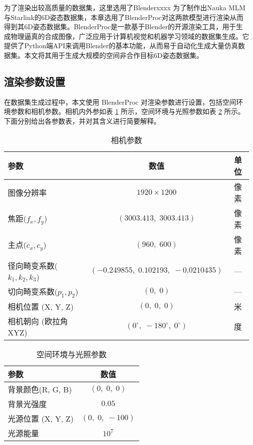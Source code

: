 为了渲染出较高质量的数据集，这里选用了Blenderxxxx
为了制作出Nauka MLM与Starlink的6D姿态数据集，本章选用了BlenderProc对这两款模型进行渲染从而得到其6D姿态数据集。BlenderProc是一款基于Blender的开源渲染工具，用于生成物理逼真的合成图像，广泛应用于计算机视觉和机器学习领域的数据集生成。它提供了Python端API来调用Blender的基本功能，从而易于自动化生成大量仿真数据集。本文将其用于生成大规模的空间非合作目标6D姿态数据集。

\subsection{渲染参数设置}
在数据集生成过程中，本文使用 BlenderProc 对渲染参数进行设置，包括空间环境参数和相机参数。相机内外参如表 \ref{tab:camera-param} 所示，空间环境与光照参数如表 \ref{tab:env-param} 所示。下面分别给出各参数表，并对其含义进行简要解释。
\begin{table}[hbt]\centering
	\caption{相机参数}
	\label{tab:camera-param}
	\begin{tabular}{lcc}
		\toprule
		参数 & 数值 & 单位 \\
		\midrule
		图像分辨率 
		& $1920 \times 1200$ 
		& 像素 \\
		焦距($f_x, f_y$) 
		& $(3003.413,\;3003.413)$
		& 像素 \\
		主点($c_x, c_y$) 
		& $(960,\;600)$ 
		& 像素 \\
		径向畸变系数($k_1, k_2, k_3$) 
		& $(-0.249855,\;0.102193,\;-0.0210435)$ 
		& — \\
		切向畸变系数($p_1, p_2$) 
		& $(0,\;0)$ 
		& — \\
		相机位置 (X, Y, Z) 
		& $(0,\;0,\;0)$ 
		& 米 \\
		相机朝向 (欧拉角XYZ) 
		& $(0^\circ,\; -180^\circ,\; 0^\circ)$ 
		& 度 \\
		\bottomrule
	\end{tabular}
\end{table}
\begin{table}[hbt]\centering
	\caption{空间环境与光照参数}
	\label{tab:env-param}
	\begin{tabular}{lc}
		\toprule
		参数 & 数值 \\
		\midrule
		背景颜色(R, G, B) 
		& $(0,\;0,\;0)$ \\
		背景光强度 
		& $0.05$ \\
		光源位置 (X, Y, Z)
		& $(0,\;0,\;-100)$ \\
		光源能量 
		& $10^7$ \\
		\bottomrule
	\end{tabular}
\end{table}
\noindent


